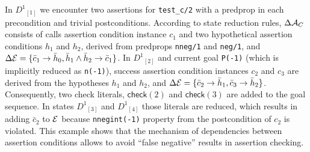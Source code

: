 \documentclass{llncs}
\newcommand{\AC}
  {\ensuremath{{\cal A}_{C}}}
\newcommand{\kbd}[1]{\mbox{\tt #1}}
\newcommand{\skbd}[1]{\mbox{\tt\small{#1}}}
\newcommand{\ADeps}{\ensuremath{{\cal E}}}
\newcommand{\nthstate}[2]{\ensuremath{{#1}_{[#2]}}}
\newcommand{\asrId}[1]{\ensuremath{c_{#1}}}
\newcommand{\negAsrId}[1]{\ensuremath{\bar{c}_{#1}}}
\newcommand{\hypId}[1]{\ensuremath{h_{#1}}}
\newcommand{\negHypId}[1]{\ensuremath{\bar{h}_{#1}}}
\newcommand{\checkLitLab}[1]{\ensuremath{\textsf{check}(#1)}}
\begin{document}
In  $\nthstate{D^1}{1}$ we encounter two assertions for
\kbd{test\_c/2} with a predprop in each precondition and trivial
postconditions.
According to state reduction rules, $\Delta\AC$ consists of calls
assertion condition instance $\asrId{1}$ and two hypothetical
assertion conditions $\hypId{1}$ and $\hypId{2}$, derived from
predprops \skbd{nneg/1} and \skbd{neg/1}, and $\Delta\ADeps =
\{\negAsrId{1} \rightarrow \negHypId{0}, \negHypId{1} \wedge
\negHypId{2} \rightarrow \negAsrId{1}\}$.
In $\nthstate{D^1}{2}$ and current goal \kbd{P(-1)} (which is
implicitly reduced as \kbd{n(-1)}), success assertion condition
instances $\asrId{2}$ and $\asrId{3}$ are derived from the hypotheses
$\hypId{1}$ and $\hypId{2}$, and $\Delta\ADeps = \{\negAsrId{2}
\rightarrow \negHypId{1}, \negAsrId{3} \rightarrow \negHypId{2} \}$.
Consequently, two check literals, $\checkLitLab{2}$ and
$\checkLitLab{3}$ are added to the goal sequence.
In states $\nthstate{D^{1}}{3}$ and $\nthstate{D^1}{4}$ those literals
are reduced, which results in adding $\negAsrId{2}$ to $\ADeps$
because \skbd{nnegint(-1)} property from the postcondition of
$\asrId{2}$ is violated.
This example shows that the mechanism of dependencies between
assertion conditions allows to avoid ``false negative'' results in
assertion checking.
\end{document}
